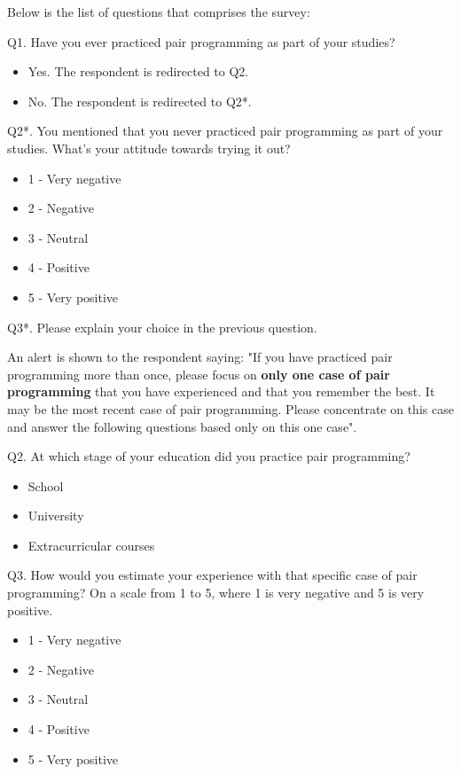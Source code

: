 \documentclass[conference]{IEEEtran}
\begin{document}
Below is the list of questions that comprises the survey:

Q1. Have you ever practiced pair programming as part of your studies?
    \begin{itemize}
        \item Yes. The respondent is redirected to Q2.
        \item No. The respondent is redirected to Q2*.
    \end{itemize}

Q2*. You mentioned that you never practiced pair programming as part of your studies. What's your attitude towards trying it out?
    \begin{itemize}
        \item 1 - Very negative
        \item 2 - Negative
        \item 3 - Neutral
        \item 4 - Positive
        \item 5 - Very positive
    \end{itemize}

Q3*. Please explain your choice in the previous question.
    
An alert is shown to the respondent saying:
"If you have practiced pair programming more than once, please focus on \textbf{only one case of pair programming} that you have experienced and that you remember the best. It may be the most recent case of pair programming. Please concentrate on this case and answer the following questions based only on this one case".

Q2. At which stage of your education did you practice pair programming?
    \begin{itemize}
        \item School
        \item University
        \item Extracurricular courses
    \end{itemize}

Q3. How would you estimate your experience with that specific case of pair programming? On a scale from 1 to 5, where 1 is very negative and 5 is very positive. 
    \begin{itemize}
        \item 1 - Very negative
        \item 2 - Negative
        \item 3 - Neutral
        \item 4 - Positive
        \item 5 - Very positive
    \end{itemize}
    
\end{document}
